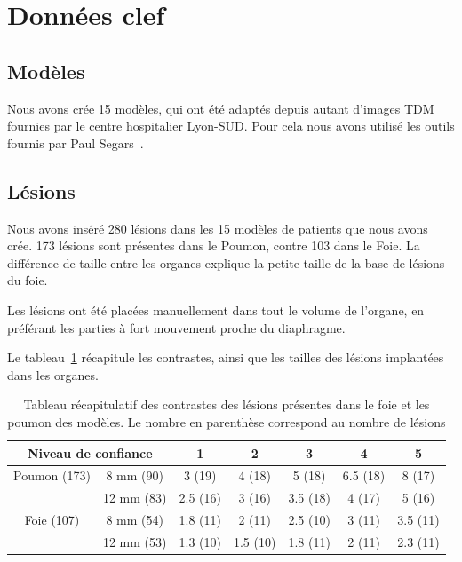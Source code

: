 \section{Données clef} %

\subsection{Modèles}

Nous avons crée 15 modèles, qui ont été adaptés depuis autant d'images TDM fournies par le centre hospitalier Lyon-SUD. Pour cela nous avons utilisé les outils fournis par Paul Segars~\cite{segars2001These}.


\subsection{Lésions}

Nous avons inséré 280 lésions dans les 15 modèles de patients que nous avons crée. 173 lésions sont présentes dans le Poumon, contre 103 dans le Foie. La différence de taille entre les organes explique la petite taille de la base de lésions du foie. 

Les lésions ont été placées manuellement dans tout le volume de l'organe, en préférant les parties à fort mouvement proche du diaphragme. 

Le tableau~\ref{tab:contrastePoumonFoieRecap} récapitule les contrastes, ainsi que les tailles des lésions implantées dans les organes.
 
\begin{table}
\centering
 \begin{tabular}{|c|c||c|c|c|c|c|} 
\hline
\multicolumn{2}{|c|}{Niveau de confiance}       & 1	  & 2	    & 3	     & 4	& 5	\\
\hline
\hline
Poumon	(173)	& 8 mm (90)	& 3 (19)  & 4 (18)  & 5 (18)  & 6.5 (18)	& 8 (17)\\
\cline{2-7}
		& 12 mm	(83)	& 2.5 (16)& 3 (16)  & 3.5 (18)& 4 (17)	& 5 (16)\\
\hline
Foie 	(107)	& 8 mm (54)		& 1.8 (11)& 2 (11)  & 2.5 (10)& 3 (11)	& 3.5 (11)\\
\cline{2-7}
		& 12 mm	(53)	& 1.3 (10)& 1.5 (10)& 1.8 (11)& 2 (11)  & 2.3 (11)\\
\hline 
 \end{tabular}

\caption[Tableau récapitulatif des lésions]{Tableau récapitulatif des contrastes des lésions présentes dans le foie et les poumon des modèles. Le nombre en parenthèse correspond au nombre de lésions}
\label{tab:contrastePoumonFoieRecap}


\end{table}


